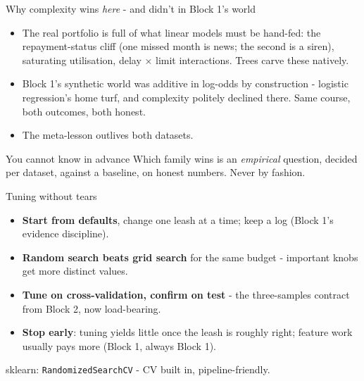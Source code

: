 \documentclass[10pt,aspectratio=169]{beamer}
\begin{document}
\begin{frame}{Why complexity wins \emph{here} - and didn't in Block 1's world}
  \begin{itemize}
    \item The real portfolio is full of what linear models must be
          \alert{hand-fed}: the repayment-status \alert{cliff} (one missed
          month is news; the second is a siren), saturating utilisation,
          delay $\times$ limit interactions. Trees carve these natively.
    \item Block 1's synthetic world was additive in log-odds by
          construction - logistic regression's home turf, and complexity
          politely declined there. Same course, both outcomes, both honest.
    \item The meta-lesson outlives both datasets.
  \end{itemize}
  \vspace{0.5em}
  \begin{block}{You cannot know in advance}
    Which family wins is an \emph{empirical} question, decided per dataset,
    against a baseline, on honest numbers. Never by fashion.
  \end{block}
\end{frame}

\begin{frame}{Tuning without tears}
  \begin{itemize}
    \item \textbf{Start from defaults}, change one leash at a time; keep a
          log (Block 1's evidence discipline).
    \item \textbf{Random search beats grid search} for the same budget -
          important knobs get more distinct values.
    \item \textbf{Tune on cross-validation, confirm on test} - the
          three-samples contract from Block 2, now load-bearing.
    \item \textbf{Stop early}: tuning yields little once the leash is
          roughly right; feature work usually pays more (Block 1, always
          Block 1).
  \end{itemize}
  \vspace{0.5em}
  \begin{center}\small
    sklearn: \texttt{RandomizedSearchCV} - CV built in, pipeline-friendly.
  \end{center}
\end{frame}
\end{document}
